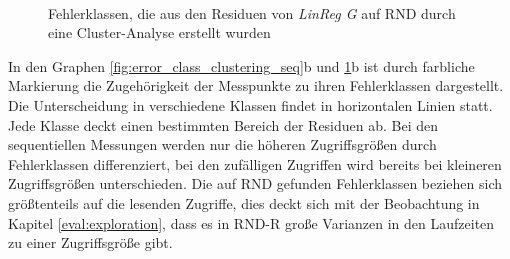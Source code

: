 \documentclass[
	twoside,
	12pt,
	a4paper,
	BCOR10mm,
	DIV14,
	listof=totoc,
	bibliography=totoc,
	headsepline
]{scrreprt}
\begin{document}
\begin{figure}[b!]
	\centering
	\hfill
	\\
	\hfill
	\vspace*{-0.3cm}
	\caption{Fehlerklassen, die aus den Residuen von \textit{LinReg G} auf RND durch eine Cluster-Analyse erstellt wurden}
	\label{fig:error_class_clustering_rnd}
\end{figure} \medskip

In den Graphen \ref{fig:error_class_clustering_seq}b und \ref{fig:error_class_clustering_rnd}b ist durch farbliche Markierung die Zugehörigkeit der Messpunkte zu ihren Fehlerklassen dargestellt.
Die Unterscheidung in verschiedene Klassen findet in horizontalen Linien statt.
Jede Klasse deckt einen bestimmten Bereich der Residuen ab.
Bei den sequentiellen Messungen werden nur die höheren Zugriffsgrößen durch Fehlerklassen differenziert, bei den zufälligen Zugriffen wird bereits bei kleineren Zugriffsgrößen unterschieden. Die auf RND gefunden Fehlerklassen beziehen sich größtenteils auf die lesenden Zugriffe, dies deckt sich mit der Beobachtung in Kapitel \ref{eval:exploration}, dass es in RND-R große Varianzen in den Laufzeiten zu einer Zugriffsgröße gibt.\medskip
\end{document}
